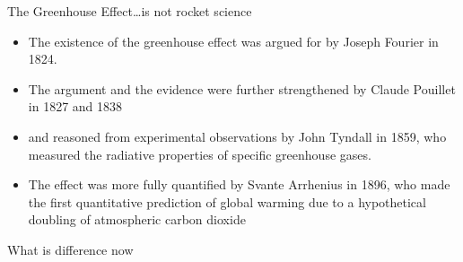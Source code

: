 \documentclass[hide notes,intlimits]{beamer}
\begin{document}
\begin{frame}
    \begin{figure}
    \end{figure}
\end{frame}

\begin{frame}{The Greenhouse Effect\ldots{}is not rocket science}
  \begin{itemize}
  \item The existence of the greenhouse effect was argued for by Joseph Fourier in 1824.
  \item The argument and the evidence were further strengthened by Claude Pouillet in 1827 and 1838 
  \item and reasoned from experimental observations by John Tyndall in 1859, who measured the radiative properties of specific greenhouse gases.
  \item The effect was more fully quantified by Svante Arrhenius in 1896, who made the first quantitative prediction of global warming due to a hypothetical doubling of atmospheric carbon dioxide
  \end{itemize}
\end{frame}

\begin{frame}{What is difference now}
  \begin{figure}
  \end{figure}
\end{frame}
\end{document}
